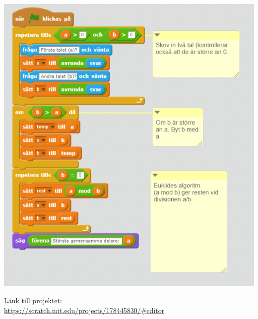 \documentclass[12pt,a4paper]{article}
\begin{document}
\includegraphics[scale=0.85]{euklidesimpl}


Länk till projektet:  \\
 \url{https://scratch.mit.edu/projects/178445830/#editor }
\end{document}
